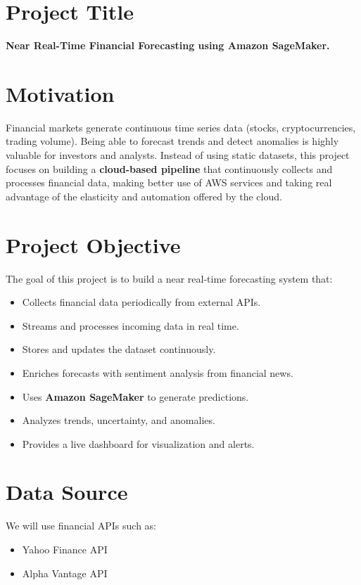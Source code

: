 \documentclass[a4paper,12pt]{article}
\begin{document}
\setcounter{section}{0}
\setcounter{subsection}{0}

\clearpage

\section{Project Title}
\textbf{Near Real-Time Financial Forecasting using Amazon SageMaker.}

\section{Motivation}
Financial markets generate continuous time series data (stocks, cryptocurrencies, trading volume).
Being able to forecast trends and detect anomalies is highly valuable for investors and analysts.
Instead of using static datasets, this project focuses on building a \textbf{cloud-based pipeline} that continuously collects and processes financial data, making better use of AWS services and taking real advantage of the elasticity and automation offered by the cloud.

\section{Project Objective}
The goal of this project is to build a near real-time forecasting system that:
\begin{itemize}[leftmargin=1.2em]
    \item Collects financial data periodically from external APIs.
    \item Streams and processes incoming data in real time.
    \item Stores and updates the dataset continuously.
    \item Enriches forecasts with sentiment analysis from financial news.
    \item Uses \textbf{Amazon SageMaker} to generate predictions.
    \item Analyzes trends, uncertainty, and anomalies.
    \item Provides a live dashboard for visualization and alerts.
\end{itemize}

\section{Data Source}
We will use financial APIs such as:
\begin{itemize}[leftmargin=1.2em]
    \item Yahoo Finance API
    \item Alpha Vantage API
\end{itemize}
\end{document}
